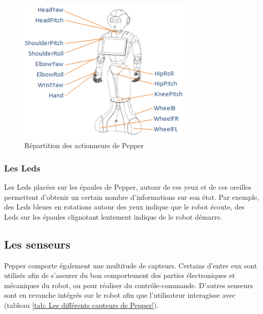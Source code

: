 \begin{figure}[h]
	\centering\includegraphics[height=7cm]{images/pepper_motors.png}
	\caption{Répartition des actionneurs de Pepper}
	\label{fig:Répartition des actionneurs de Pepper}
\end{figure}

\subsubsection{Les Leds}
\label{Introduction:Présentation du produit:Les actionneurs: Les leds}
Les Leds placées sur les épaules de Pepper, autour de ces yeux et de ces oreilles permettent d'obtenir un certain nombre d'informations sur son état. Par exemple, des Leds bleues en rotations autour des yeux indique que le robot écoute, des Leds sur les épaules clignotant lentement indique de le robot démarre.  

\subsection{Les senseurs}
\label{Introduction:Présentation du produit:Les senseurs}
Pepper comporte également une multitude de capteurs. Certains d'entre eux sont utilisés afin de s'assurer du bon comportement des parties électroniques et mécaniques du robot, ou pour réaliser du contrôle-commande. D'autres senseurs sont en revanche intégrés sur le robot afin que l'utilisateur interagisse avec (tableau \ref{tab: Les différents capteurs de Pepper}).

